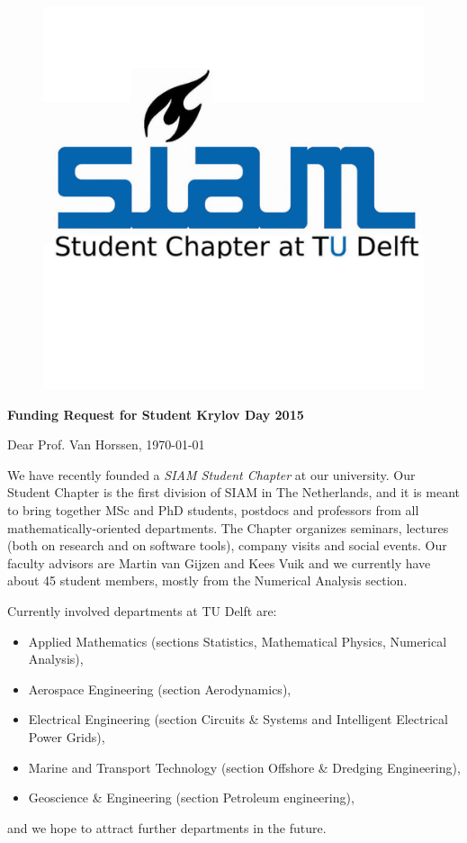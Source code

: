 \documentclass[a4paper,10pt]{article}
\begin{document}
 

\clearpage
\thispagestyle{empty}

\begin{figure}
\hspace{10cm} \includegraphics[clip = true, viewport = 0cm 0cm 4.5cm 3.5cm, scale = 1]{SIAMSC_Delft} 
\end{figure}

\textbf{Funding Request for Student Krylov Day 2015}
\bigskip
\bigskip

Dear Prof. Van Horssen, \hfill \today

\bigskip
We have recently founded a \textit{SIAM Student Chapter} at our university. Our Student Chapter is the first division of SIAM in The Netherlands, and it is meant to bring together MSc and PhD students, postdocs and professors from all mathematically-oriented departments. The Chapter organizes seminars, lectures (both on research and on software tools), company visits and social events. Our faculty advisors are Martin van Gijzen and Kees Vuik and we currently have about 45 student members, mostly from the Numerical Analysis section.

\bigskip
\noindent Currently involved departments at TU Delft are:
\begin{itemize}
 \item Applied Mathematics (sections Statistics, Mathematical Physics, Numerical Analysis),
 \item Aerospace Engineering (section Aerodynamics),
 \item Electrical Engineering (section Circuits \& Systems and Intelligent Electrical Power Grids),
 \item Marine and Transport Technology (section Offshore \& Dredging Engineering),
 \item Geoscience \& Engineering (section Petroleum engineering),
\end{itemize}
and we hope to attract further departments in the future.
\end{document}
